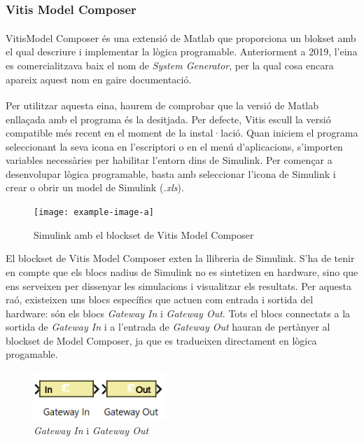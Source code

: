 \subsubsection{ Vitis Model Composer }
{ 
    Vitis\texttrademark Model Composer és una extensió de
    Matlab\textsuperscript{\textregistered} que proporciona un blokset amb
    el qual descriure i implementar la lògica programable. Anteriorment a
    2019, l'eina es comercialitzava baix el nom de \emph{System Generator},
    per la qual cosa encara apareix aquest nom en gaire documentació.

    Per utilitzar aquesta eina, haurem de comprobar que la versió de
    Matlab\textsuperscript{\textregistered} enllaçada amb el programa és la
    desitjada. Per defecte, Vitis escull la versió compatible més recent en
    el moment de la instal·lació. Quan iniciem el programa seleccionant la
    seva icona en l'escriptori o en el menú d'aplicacions, s'importen
    variables necessàries per habilitar l'entorn dins de Simulink. Per
    començar a desenvolupar lògica programable, basta amb seleccionar
    l'icona de Simulink i crear o obrir un model de Simulink (\emph{.xls}).

    \begin{figure}[!htb]
        \centering
        \captionsetup{justification=centering,margin=1.5cm}
        \texttt{[image: example-image-a]}
        \caption{ Simulink amb el blockset de Vitis Model Composer }
    \end{figure}

    El blockset de Vitis Model Composer exten la llibreria de Simulink.
    S'ha de tenir en compte que els blocs nadius de Simulink no es
    sintetizen en hardware, sino que ens serveixen per dissenyar les
    simulacions i visualitzar els resultats. Per aquesta raó, existeixen
    uns blocs específics que actuen com entrada i sortida del hardware: són
    els blocs \emph{Gateway In} i \emph{Gateway Out}. Tots el blocs
    connectats a la sortida de \emph{Gateway In} i a l'entrada de
    \emph{Gateway Out} hauran de pertànyer al blockset de Model Composer,
    ja que es tradueixen directament en lògica progamable.

    \begin{figure}[!htb]
        \centering
        \captionsetup{justification=centering,margin=1.5cm}
        \includegraphics[width=5cm]
            { img/model_composer/gateways.png }
        \caption{ \emph{Gateway In} i \emph{Gateway Out} }
    \end{figure}

}
